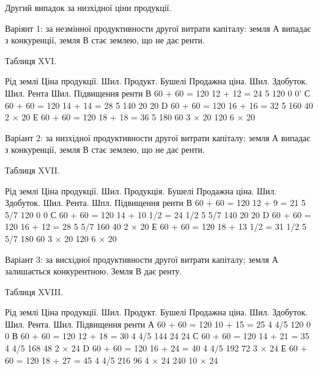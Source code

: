 Другий випадок за низхідної ціни продукції.

Варіянт 1: за незмінної продуктивности другої витрати капіталу: земля
А випадає з конкуренції, земля В стає землею, що не дає ренти.

Таблиця XVI.

Рід землі
Ціна продукції. Шил.
Продукт. Бушелі
Продажна ціна. Шил.
Здобуток. Шил.
Рента Шил.
Підвищення ренти
В 60 + 60 = 120 12 + 12 = 24 5 120 0 0'
С 60 + 60 = 120 14 + 14 = 28 5 140 20 20
D 60 + 60 = 120 16 + 16 = 32 5 160 40 2 × 20
Е 60 + 60 = 120 18 + 18 = 36 5 180 60 3 × 20
120 6 × 20

Варіант 2: за низхідної продуктивности другої витрати капіталу; земля
А випадає з конкуренції, земля В стає землею, що не дає ренти.

Таблиця XVII.

Рід землі
Ціна продукції. Шил.
Продукція. Бушелі
Продажна ціна. Шил.
Здобуток. Шил.
Рента. Шпл.
Підвищення ренти
В    60 + 60 = 120                   12 + 9 = 21    5 5/7    120    0         0
С    60 + 60 = 120    14 + 10 1/2 = 24 1/2    5 5/7    140   20       20
D    60 + 60 = 120                 16 + 12 = 28    5 5/7    160   40    2 × 20
Е    60 + 60 = 120    18 + 13 1/2 = 31 1/2    5 5/7    180   60    3 × 20
120 6 × 20

Варіант 3: за висхідної продуктивности другої витрати капіталу; земля
А залишається конкурентною. Земля В дає ренту.

Таблиця XVIII.

Рід землі
Ціна продукції. Шил.
Продукт. Бушелі
Продажна ціна. Шил.
Здобуток. Шил.
Рента. Шил.
Підвищення ренти
А    60 + 60 = 120    10 + 15 = 25    4 4/5    120       0          0
В    60 + 60 = 120    12 + 18 = 30    4 4/5    144     24         24
С    60 + 60 = 120    14 + 21 = 35    4 4/5    168     48     2 × 24
D    60 + 60 = 120    16 + 24 = 40    4 4/5    192     72     3 × 24
Е    60 + 60 = 120    18 + 27 = 45    4 4/5    216     96     4 × 24
240 10 × 24

